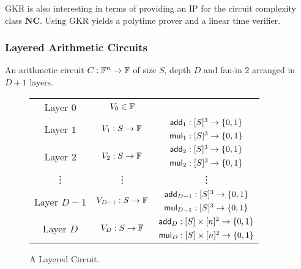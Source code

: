 GKR is also interesting in terms of providing an IP for the circuit complexity class $\mathbf{NC}$. Using GKR yields a polytime prover and a linear time verifier.

\subsubsection{Layered Arithmetic Circuits}

\begin{definition}
	An arithmetic circuit $C:\mathbb{F}^n\rightarrow\mathbb{F}$ of size $S$, depth $D$ and fan-in $2$ arranged in $D+1$ layers.
\end{definition}

\begin{figure}[h]
	\begin{center}
		{\renewcommand{\arraystretch}{1.2}%
		\begin{tabular}{ c c c }
			\hline
			\multirow{2}{6em}{Layer $0$} & \multirow{2}{6em}{$V_0\in\mathbb{F}$} & \\
			&&\\
			\hline
			\multirow{2}{6em}{Layer $1$} & \multirow{2}{6em}{$V_1:S\rightarrow\mathbb{F}$} & $\mathsf{add}_1:[S]^3\rightarrow\{0,1\}$ \\ 
			& & $\mathsf{mul}_1:[S]^3\rightarrow\{0,1\}$ \\
			\hline
			\multirow{2}{6em}{Layer $2$} & \multirow{2}{6em}{$V_2:S\rightarrow\mathbb{F}$} & $\mathsf{add}_2:[S]^3\rightarrow\{0,1\}$ \\ 
			& & $\mathsf{mul}_2:[S]^3\rightarrow\{0,1\}$ \\
			\hline
			\vdots & \vdots & \vdots \\
			\hline
			\multirow{2}{6em}{Layer $D-1$} & \multirow{2}{6em}{$V_{D-1}:S\rightarrow\mathbb{F}$} & $\mathsf{add}_{D-1}:[S]^3\rightarrow\{0,1\}$ \\ 
			& & $\mathsf{mul}_{D-1}:[S]^3\rightarrow\{0,1\}$ \\ 
			\hline
			\multirow{2}{6em}{Layer $D$} & \multirow{2}{6em}{$V_D:S\rightarrow\mathbb{F}$} & $\mathsf{add}_D:[S]\times [n]^2\rightarrow\{0,1\}$ \\ 
			& & $\mathsf{mul}_D:[S]\times[n]^2\rightarrow\{0,1\}$ \\
			\hline
		\end{tabular}
	}
	\end{center}
	\caption{A Layered Circuit.}
	\label{fig:layeredcircuit}
\end{figure}

